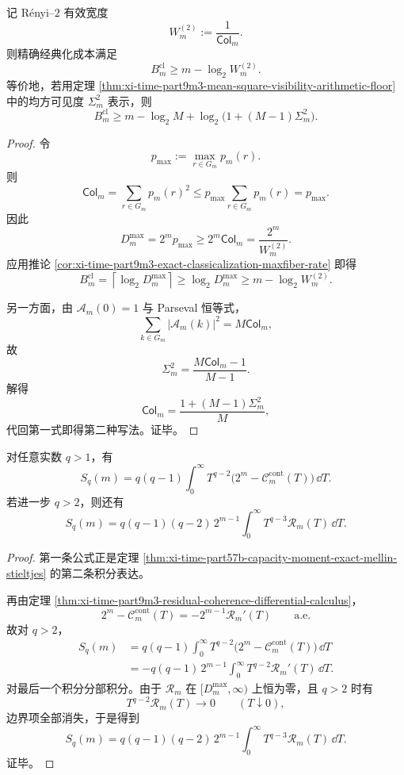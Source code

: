 \begin{theorem}[可见度与经典化成本的互补下界]\label{thm:xi-time-part9m3-visibility-classicalization-complementarity}
记 Rényi--\(2\) 有效宽度
\[
W_m^{(2)}:=\frac{1}{\mathsf{Col}_m}.
\]
则精确经典化成本满足
\[
B_m^{\mathrm{cl}}\ge m-\log_2 W_m^{(2)}.
\]
等价地，若用定理 \ref{thm:xi-time-part9m3-mean-square-visibility-arithmetic-floor} 中的均方可见度 \(\Sigma_m^2\) 表示，则
\[
B_m^{\mathrm{cl}}
\ge
m-\log_2 M+\log_2\bigl(1+(M-1)\Sigma_m^2\bigr).
\]
\end{theorem}
\begin{proof}
令
\[
p_{\max}:=\max_{r\in G_m}p_m(r).
\]
则
\[
\mathsf{Col}_m=\sum_{r\in G_m}p_m(r)^2
\le
p_{\max}\sum_{r\in G_m}p_m(r)
=
p_{\max}.
\]
因此
\[
D_m^{\max}=2^m p_{\max}\ge 2^m\mathsf{Col}_m=\frac{2^m}{W_m^{(2)}}.
\]
应用推论 \ref{cor:xi-time-part9m3-exact-classicalization-maxfiber-rate} 即得
\[
B_m^{\mathrm{cl}}
=
\left\lceil \log_2 D_m^{\max}\right\rceil
\ge
\log_2 D_m^{\max}
\ge
m-\log_2 W_m^{(2)}.
\]

另一方面，由 \(\mathcal A_m(0)=1\) 与 Parseval 恒等式，
\[
\sum_{k\in G_m}|\mathcal A_m(k)|^2
=
M\mathsf{Col}_m,
\]
故
\[
\Sigma_m^2
=
\frac{M\mathsf{Col}_m-1}{M-1}.
\]
解得
\[
\mathsf{Col}_m=\frac{1+(M-1)\Sigma_m^2}{M},
\]
代回第一式即得第二种写法。证毕。
\end{proof}

\begin{theorem}\label{thm:xi-time-part9m3-capacity-defect-residual-coherence-mellin}
对任意实数 \(q>1\)，有
\[
S_q(m)
=
q(q-1)\int_0^\infty
T^{q-2}\bigl(2^m-\mathcal C_m^{\mathrm{cont}}(T)\bigr)\,\dd T.
\]
若进一步 \(q>2\)，则还有
\[
S_q(m)
=
q(q-1)(q-2)\,2^{m-1}
\int_0^\infty T^{q-3}\mathscr R_m(T)\,\dd T.
\]
\end{theorem}
\begin{proof}
第一条公式正是定理 \ref{thm:xi-time-part57b-capacity-moment-exact-mellin-stieltjes} 的第二条积分表达。

再由定理 \ref{thm:xi-time-part9m3-residual-coherence-differential-calculus}，
\[
2^m-\mathcal C_m^{\mathrm{cont}}(T)
=
-2^{m-1}\mathscr R_m'(T)
\qquad
\text{a.e.}
\]
故对 \(q>2\)，
\[
\begin{aligned}
S_q(m)
&=
q(q-1)\int_0^\infty
T^{q-2}\bigl(2^m-\mathcal C_m^{\mathrm{cont}}(T)\bigr)\,\dd T\\
&=
-q(q-1)\,2^{m-1}\int_0^\infty T^{q-2}\mathscr R_m'(T)\,\dd T.
\end{aligned}
\]
对最后一个积分分部积分。由于 \(\mathscr R_m\) 在 \([D_m^{\max},\infty)\) 上恒为零，且 \(q>2\) 时有
\[
T^{q-2}\mathscr R_m(T)\longrightarrow 0
\qquad
(T\downarrow 0),
\]
边界项全部消失，于是得到
\[
S_q(m)
=
q(q-1)(q-2)\,2^{m-1}
\int_0^\infty T^{q-3}\mathscr R_m(T)\,\dd T.
\]
证毕。
\end{proof}

